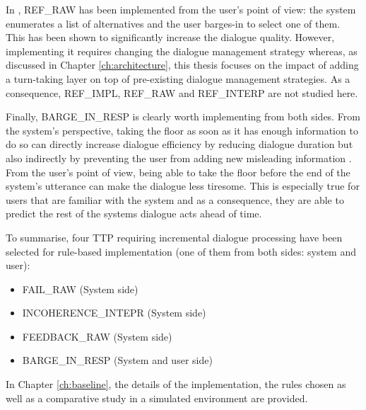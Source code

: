 				In \cite{El-Asri2014a}, REF\_RAW has been implemented from the user's point of view: the system enumerates a list of alternatives and the user barges-in to select one of them. This has been shown to significantly increase the dialogue quality. However, implementing it requires changing the dialogue management strategy whereas, as discussed in Chapter \ref{ch:architecture}, this thesis focuses on the impact of adding a turn-taking layer on top of pre-existing dialogue management strategies. As a consequence, REF\_IMPL, REF\_RAW and REF\_INTERP are not studied here.

				Finally, BARGE\_IN\_RESP is clearly worth implementing from both sides. From the system's perspective, taking the floor as soon as it has enough information to do so can directly increase dialogue efficiency by reducing dialogue duration but also indirectly by preventing the user from adding new misleading information \cite{Ghigi2014}. From the user's point of view, being able to take the floor before the end of the system's utterance can make the dialogue less tiresome. This is especially true for users that are familiar with the system and as a consequence, they are able to predict the rest of the systems dialogue acts ahead of time.

				To summarise, four TTP requiring incremental dialogue processing have been selected for rule-based implementation (one of them from both sides: system and user):
				\begin{itemize}
					\item FAIL\_RAW (System side)
					\item INCOHERENCE\_INTEPR (System side)
					\item FEEDBACK\_RAW (System side)
					\item BARGE\_IN\_RESP (System and user side)
				\end{itemize}

				In Chapter \ref{ch:baseline}, the details of the implementation, the rules chosen as well as a comparative study in a simulated environment are provided.
